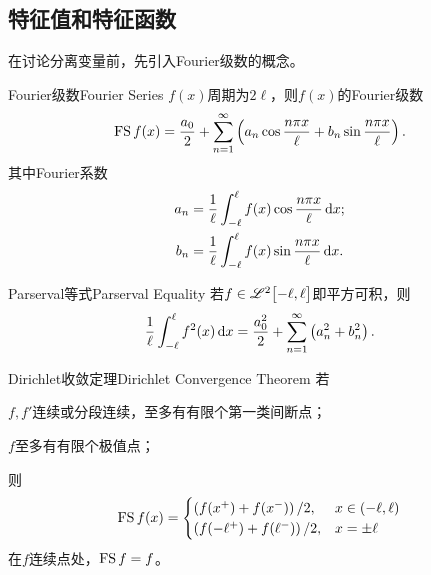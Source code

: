 \subsection{特征值和特征函数}
在讨论分离变量前，先引入Fourier级数的概念。
\begin{definition}{Fourier级数}{Fourier Series}
	$f(x)$周期为$2\ell$，则$f(x)$的Fourier级数
	\begin{align}
		\operatorname{FS} f(x)=\frac{a_0}2+\sum_{n=1}^\infty\left(a_n\cos\frac{n\pi x}\ell+b_n\sin\frac{n\pi x}\ell\right).
	\end{align}
	其中Fourier系数
	\begin{align*}
		a_n & =\frac1\ell\int_{-\ell}^\ell f(x)\cos\frac{n\pi x}\ell\mathop{}\!\mathrm{d} x; \\
		b_n & =\frac1\ell\int_{-\ell}^\ell f(x)\sin\frac{n\pi x}\ell\mathop{}\!\mathrm{d} x.
	\end{align*}
\end{definition}
\begin{theorem}{Parserval等式}{Parserval Equality}
	若$f\in\mathscr L^2\bigl[-\ell,\ell\bigr]$即平方可积，则
	\[
		\frac1\ell\int_{-\ell}^\ell f^2(x)\mathop{}\!\mathrm{d} x=\frac{a_0^2}2+\sum_{n=1}^\infty\left(a_n^2+b_n^2\right).
	\]
\end{theorem}
\begin{theorem}{Dirichlet收敛定理}{Dirichlet Convergence Theorem}
	若
	\begin{compactenum}
		\item $f,f'$连续或分段连续，至多有有限个第一类间断点；%
		\item $f$至多有有限个极值点；
	\end{compactenum}
	则
	\begin{align*}
		\operatorname{FS} f(x)
		=\begin{cases}
			\left(f(x^+)+f(x^-)\right)/2,        & x\in(-\ell,\ell) \\
			\left(f(-\ell^+)+f(\ell^-)\right)/2, & x=\pm\ell
		\end{cases}
	\end{align*}
	在$f$连续点处，$\operatorname{FS} f=f$。
\end{theorem}
